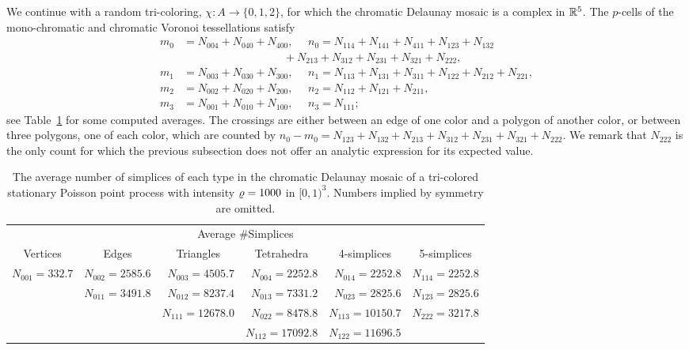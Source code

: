 \documentclass[a4paper]{article}
\newcommand {\mm}[1]   {\ifmmode{#1}\else{\mbox{\(#1\)}}\fi}
\newcommand{\Rspace}        {\mm{{\mathbb R}}}
\newcommand{\intensity}     {\mm{\varrho}}
\theoremstyle{definition}
\numberwithin{theorem}{section}
\numberwithin{equation}{section}
\begin{document}
\medskip
We continue with a random tri-coloring, $\chi \colon A \to \{ 0,1,2 \}$, for which the chromatic Delaunay mosaic is a complex in $\Rspace^5$.
The $p$-cells of the mono-chromatic and chromatic Voronoi tessellations satisfy
\begin{align}
  m_0  &=  N_{004} + N_{040} + N_{400} ,  ~~~~~~n_0  =  N_{114} + N_{141} + N_{411} + N_{123} + N_{132} \nonumber \\
  &~~~~~~~~~~~~~~~~~~~~~~~~~~~~~~~~~~~~~~~~~+ N_{213} + N_{312} + N_{231} + N_{321} + N_{222}, 
    \label{eqn:m0n0s3d3} \\
  m_1  &=  N_{003} + N_{030} + N_{300} ,  ~~~~~~n_1  =  N_{113} + N_{131} + N_{311} + N_{122} + N_{212} + N_{221} , 
    \label{eqn:m1n1s3d3} \\
  m_2  &=  N_{002} + N_{020} + N_{200} ,  ~~~~~~n_2  =  N_{112} + N_{121} + N_{211},
    \label{eqn:m2n2s3d3} \\
  m_3  &=  N_{001} + N_{010} + N_{100} ,  ~~~~~~n_3  =  N_{111} ;
    \label{eqn:mpnp_d3_s2}
\end{align}
see Table~\ref{tbl:simplices_d3_s2} for some computed averages.
The crossings are either between an edge of one color and a polygon of another color, or between three polygons, one of each color, which are counted by $n_0 - m_0 = N_{123} + N_{132} + N_{213} + N_{312} + N_{231} + N_{321} + N_{222}$.
We remark that $N_{222}$ is the only count for which the previous subsection does not offer an analytic expression for its expected value.
\begin{table}[hbt]
    \centering
    \begin{tabular}{rrrrrr}
      \multicolumn{6}{c}{Average \#Simplices} \\
      \multicolumn{1}{c}{Vertices} & \multicolumn{1}{c}{Edges} & \multicolumn{1}{c}{Triangles} & \multicolumn{1}{c}{Tetrahedra} & \multicolumn{1}{c}{4-simplices} & \multicolumn{1}{c}{5-simplices} \\
      \hline
      \footnotesize{$N_{001} = 332.7$} 
      & \!\!\footnotesize{$N_{002} = 2585.6$} 
      & \!\!\footnotesize{$N_{003} = 4505.7$} 
      & \!\!\footnotesize{$N_{004} = 2252.8$} 
      & \!\!\footnotesize{$N_{014} = 2252.8$} 
      & \!\!\footnotesize{$N_{114} = 2252.8$} \\
      & \!\!\footnotesize{$N_{011} = 3491.8$} 
      & \!\!\footnotesize{$N_{012} = 8237.4$} 
      & \!\!\footnotesize{$N_{013} = 7331.2$} 
      & \!\!\footnotesize{$N_{023} = 2825.6$} 
      & \!\!\footnotesize{$N_{123} = 2825.6$} \\
    & & \!\!\footnotesize{$N_{111} = 12678.0$} 
      & \!\!\footnotesize{$N_{022} = 8478.8$} 
      & \!\!\footnotesize{$N_{113} = 10150.7$} 
      & \!\!\footnotesize{$N_{222} = 3217.8$} \\
  & & & \!\!\footnotesize{$N_{112} = 17092.8$} 
      & \!\!\footnotesize{$N_{122} = 11696.5$} &
    \end{tabular}
    \caption{The average number of simplices of each type in the chromatic Delaunay mosaic of a tri-colored stationary Poisson point process with intensity $\intensity = 1000$ in $[0,1)^3$.
    Numbers implied by symmetry are omitted.}
    \label{tbl:simplices_d3_s2}
\end{table}
\end{document}
